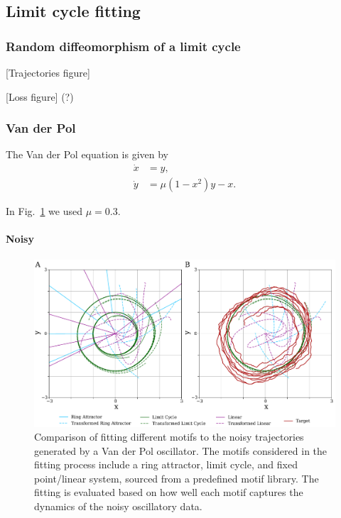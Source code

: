 \documentclass{article}
\theoremstyle{definition} \newtheorem{definition}{Definition}  \newtheorem{example}{Example}
\theoremstyle{remark} \newtheorem{remark}{Remark}
\newcounter{ct}
\begin{document}
\subsection{Limit cycle fitting}

\subsubsection{Random diffeomorphism of a limit cycle}

[Trajectories figure]

[Loss figure] (?)



\subsubsection{Van der Pol}
The Van der Pol equation is given by 
\begin{equation}
\begin{aligned}
\dot{x} &= y, \\
\dot{y} &= \mu (1 - x^2) y - x.
\end{aligned}
\end{equation}

In Fig.~\ref{fig:all_motifs_vdp} we used $\mu=0.3$.



\paragraph{Noisy}
\begin{figure}[htbp]
    \centering
    \includegraphics[width=.9\linewidth]{all_motifs_vdp_noisy_var1_ntraj5_ai}
    \caption{Comparison of fitting different motifs to the noisy trajectories generated by a Van der Pol oscillator. The motifs considered in the fitting process include a ring attractor, limit cycle, and fixed point/linear system, sourced from a predefined motif library. The fitting is evaluated based on how well each motif captures the dynamics of the noisy oscillatory data.}
    \label{fig:all_motifs_vdp}
\end{figure}
\end{document}
